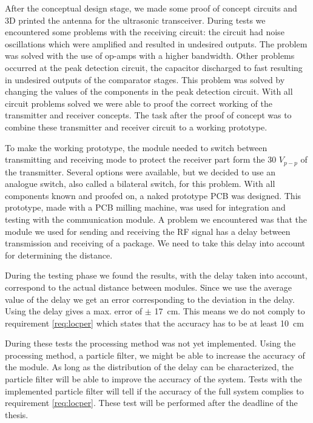 After the conceptual design stage, we made some proof of concept circuits and 3D printed the antenna for the ultrasonic transceiver.
During tests we encountered some problems with the receiving circuit: the circuit had noise oscillations which were amplified and resulted in undesired outputs.
The problem was solved with the use of op-amps with a higher bandwidth.
Other problems occurred at the peak detection circuit, the capacitor discharged to fast resulting in undesired outputs of the comparator stages.
This problem was solved by changing the values of the components in the peak detection circuit.
With all circuit problems solved we were able to proof the correct working of the transmitter and receiver concepts.
The task after the proof of concept was to combine these transmitter and receiver circuit to a working prototype.

To make the working prototype, the module needed to switch between transmitting and receiving mode to protect the receiver part form the 30 $V_{p-p}$ of the transmitter.
Several options were available, but we decided to use an analogue switch, also called a bilateral switch, for this problem.
With all components known and proofed on, a naked prototype PCB was designed.
This prototype, made with a PCB milling machine, was used for integration and testing with the communication module.
A problem we encountered was that the module we used for sending and receiving the RF signal has a delay between transmission and receiving of a package.
We need to take this delay into account for determining the distance.

During the testing phase we found the results, with the delay taken into account, correspond to the actual distance between modules.
Since we use the average value of the delay we get an error corresponding to the deviation in the delay.
Using the delay gives a max. error of $\pm$ \SI{17}{\centi\meter}.
This means we do not comply to requirement \ref{req:locper} which states that the accuracy has to be at least \SI{10}{\centi\meter}

During these tests the processing method was not yet implemented.
Using the processing method, a particle filter, we might be able to increase the accuracy of the module.
As long as the distribution of the delay can be characterized, the particle filter will be able to improve the accuracy of the system.
Tests with the implemented particle filter will tell if the accuracy of the full system complies to requirement \ref{req:locper}.
These test will be performed after the deadline of the thesis.

